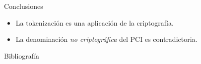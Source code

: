 \documentclass{beamer}
\begin{document}
  \begin{frame}{Conclusiones}
    \begin{itemize}
      \item La tokenización es una aplicación de la criptografía.
      \item La denominación \textit{no criptográfica} del PCI es contradictoria.
    \end{itemize}
  \end{frame}

  \begin{frame}[allowframebreaks]{Bibliografía}
    \printbibliography
  \end{frame}

  \setlength{\parskip}{0.0em}

  {
  \frame{\titlepage}}
\end{document}
